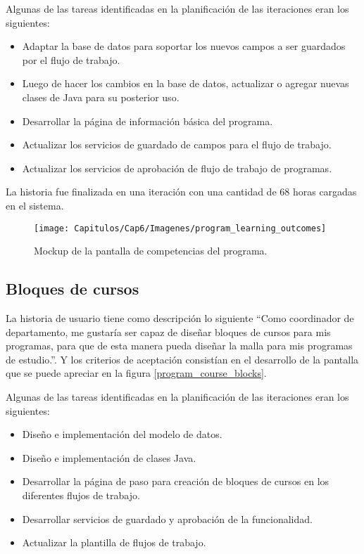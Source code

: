 Algunas de las tareas identificadas en la planificación de las iteraciones eran los siguientes:
\begin{itemize}
	\item Adaptar la base de datos para soportar los nuevos campos a ser guardados por el flujo de trabajo.
	\item Luego de hacer los cambios en la base de datos, actualizar o agregar nuevas clases de Java para su posterior uso.
	\item Desarrollar la página de información básica del programa.
	\item Actualizar los servicios de guardado de campos para el flujo de trabajo.
	\item Actualizar los servicios de aprobación de flujo de trabajo de programas.
\end{itemize}

La historia fue finalizada en una iteración con una cantidad de 68 horas cargadas en el sistema.

\begin{figure}[H]
\centering
\texttt{[image: Capitulos/Cap6/Imagenes/program\_learning\_outcomes]}
\caption{Mockup de la pantalla de competencias del programa.}
  \label{program_learning_outcomes}
\end{figure}

\subsection{Bloques de cursos}
La historia de usuario tiene como descripción lo siguiente \enquote{Como coordinador de departamento, me gustaría ser capaz de diseñar bloques de cursos para mis programas, para que de esta manera pueda diseñar la malla para mis programas de estudio.}. Y los criterios de aceptación consistían en el desarrollo de la pantalla que se puede apreciar en la figura \ref{program_course_blocks}.

Algunas de las tareas identificadas en la planificación de las iteraciones eran los siguientes:
\begin{itemize}
	\item Diseño e implementación del modelo de datos.
	\item Diseño e implementación de clases Java.
	\item Desarrollar la página de paso para creación de bloques de cursos en los diferentes flujos de trabajo.
	\item Desarrollar servicios de guardado y aprobación de la funcionalidad.
	\item Actualizar la plantilla de flujos de trabajo.
\end{itemize}

